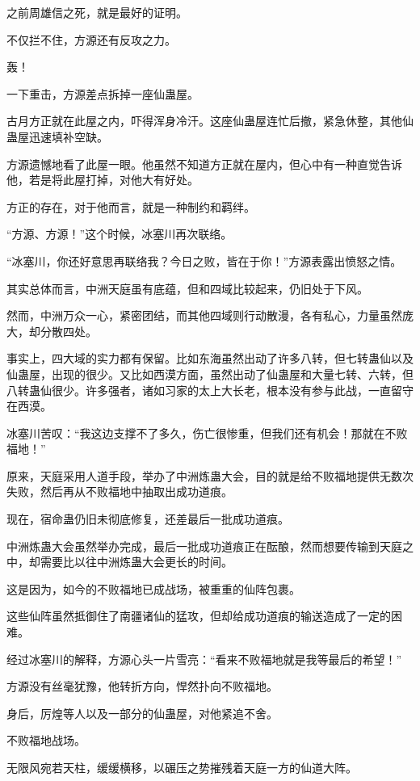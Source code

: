 \begin{this_body}
之前周雄信之死，就是最好的证明。

不仅拦不住，方源还有反攻之力。

轰！

一下重击，方源差点拆掉一座仙蛊屋。

古月方正就在此屋之内，吓得浑身冷汗。这座仙蛊屋连忙后撤，紧急休整，其他仙蛊屋迅速填补空缺。

方源遗憾地看了此屋一眼。他虽然不知道方正就在屋内，但心中有一种直觉告诉他，若是将此屋打掉，对他大有好处。

方正的存在，对于他而言，就是一种制约和羁绊。

“方源、方源！”这个时候，冰塞川再次联络。

“冰塞川，你还好意思再联络我？今日之败，皆在于你！”方源表露出愤怒之情。

其实总体而言，中洲天庭虽有底蕴，但和四域比较起来，仍旧处于下风。

然而，中洲万众一心，紧密团结，而其他四域则行动散漫，各有私心，力量虽然庞大，却分散四处。

事实上，四大域的实力都有保留。比如东海虽然出动了许多八转，但七转蛊仙以及仙蛊屋，出现的很少。又比如西漠方面，虽然出动了仙蛊屋和大量七转、六转，但八转蛊仙很少。许多强者，诸如习家的太上大长老，根本没有参与此战，一直留守在西漠。

冰塞川苦叹：“我这边支撑不了多久，伤亡很惨重，但我们还有机会！那就在不败福地！”

原来，天庭采用人道手段，举办了中洲炼蛊大会，目的就是给不败福地提供无数次失败，然后再从不败福地中抽取出成功道痕。

现在，宿命蛊仍旧未彻底修复，还差最后一批成功道痕。

中洲炼蛊大会虽然举办完成，最后一批成功道痕正在酝酿，然而想要传输到天庭之中，却需要比以往中洲炼蛊大会更长的时间。

这是因为，如今的不败福地已成战场，被重重的仙阵包裹。

这些仙阵虽然抵御住了南疆诸仙的猛攻，但却给成功道痕的输送造成了一定的困难。

经过冰塞川的解释，方源心头一片雪亮：“看来不败福地就是我等最后的希望！”

方源没有丝毫犹豫，他转折方向，悍然扑向不败福地。

身后，厉煌等人以及一部分的仙蛊屋，对他紧追不舍。

不败福地战场。

无限风宛若天柱，缓缓横移，以碾压之势摧残着天庭一方的仙道大阵。


\end{this_body}
